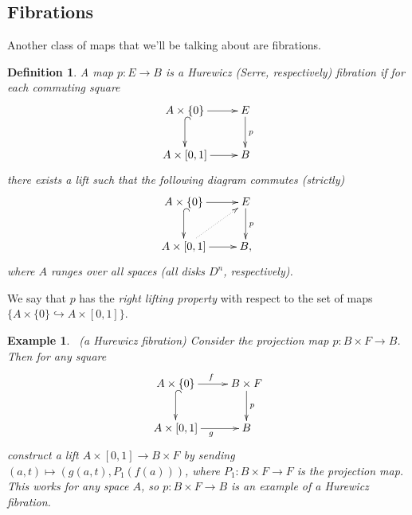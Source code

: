 \documentclass{article}
\newtheorem{definition}[theorem]{Definition}
\newtheorem{example}[theorem]{Example}
\newtheorem{proposed work}[theorem]{Proposed Work}
\theoremstyle{definition}
\newcommand{\xymat}[1]{\begin{align*}\xymatrix{ #1}\end{align*}}
\begin{document}
\subsection{Fibrations}
Another class of maps that we'll be talking about are fibrations.
\begin{definition}
A map $p:E\to B$ is a Hurewicz (Serre, respectively) fibration if for each commuting square
\xymat{A\times \lbrace 0\rbrace \ar[r] \ar@{^{(}->}[d] & E \ar[d]^p \\ A\times [0,1] \ar[r] & B} 
there exists a lift such that the following diagram commutes (strictly)
\xymat{A\times \lbrace 0\rbrace \ar[r] \ar@{^{(}->}[d] & E \ar[d]^p \\ A\times [0,1] \ar[r]\ar@{.>}[ur] & B,}
where $A$ ranges over all spaces (all disks $D^n$, respectively).
\end{definition}
We say that $p$ has the \textit{right lifting property} with respect to the set of maps $\lbrace A\times \lbrace 0\rbrace\hookrightarrow A\times [0,1]\rbrace$.

\begin{example}~\label{projfib}(a Hurewicz fibration) Consider the projection map $p: B\times F\to B$. Then for any square
\xymat{A\times \lbrace 0\rbrace \ar[r]^f \ar@{^{(}->}[d] & B\times F \ar[d]^p \\ A\times [0,1] \ar[r]_g & B}
construct a lift $A \times [0,1] \to B \times F$ by sending $(a,t)\mapsto (g(a,t), P_1(f(a)))$, where $P_1: B\times F\to F$ is the projection map. This works for any space $A$, so $p : B\times F\to B$ is an example of a Hurewicz fibration. 
\end{example}
\end{document}

